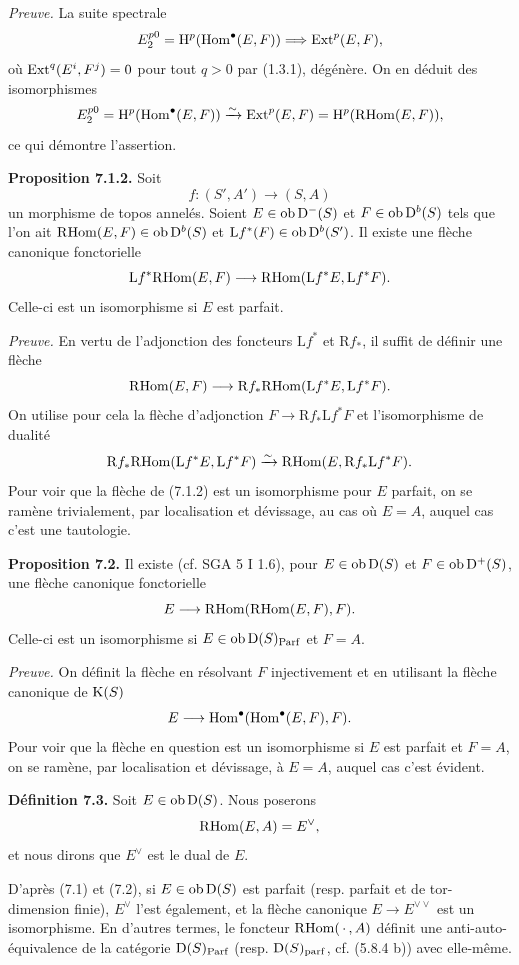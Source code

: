 \documentclass[11pt]{article}
\newcommand{\Parf}{\operatorname{Parf}}
\begin{document}
\emph{Preuve.} La suite spectrale
\[
  E_2^{p0}=\mathrm H^p(\operatorname{Hom}^\bullet(E,F))
  \Longrightarrow \operatorname{Ext}^p(E,F),
\]
où \(\operatorname{Ext}^q(E^i,F^j)=0\) pour tout \(q>0\) par (1.3.1), dégénère. On en déduit des isomorphismes
\[
  E_2^{p0}=\mathrm H^p(\operatorname{Hom}^\bullet(E,F))
  \xrightarrow{\sim}\operatorname{Ext}^p(E,F)=\mathrm H^p(\mathrm R\!\operatorname{Hom}(E,F)),
\]
ce qui démontre l'assertion.

\textbf{Proposition 7.1.2.} Soit
\[
  f:(S',A')\longrightarrow(S,A)
\]
un morphisme de topos annelés. Soient \(E\in\operatorname{ob}\mathrm D^-(S)\) et \(F\in\operatorname{ob}\mathrm D^b(S)\) tels que l'on ait \(\mathrm R\!\operatorname{Hom}(E,F)\in\operatorname{ob}\mathrm D^b(S)\) et \(\mathrm Lf^*(F)\in\operatorname{ob}\mathrm D^b(S')\). Il existe une flèche canonique fonctorielle
\[
  \mathrm Lf^*\mathrm R\!\operatorname{Hom}(E,F)
  \longrightarrow
  \mathrm R\!\operatorname{Hom}(\mathrm Lf^*E,\mathrm Lf^*F).
\]
Celle-ci est un isomorphisme si \(E\) est parfait.

\emph{Preuve.} En vertu de l'adjonction des foncteurs \(\mathrm Lf^*\) et \(\mathrm Rf_*\), il suffit de définir une flèche
\[
  \mathrm R\!\operatorname{Hom}(E,F)
  \longrightarrow
  \mathrm Rf_*\mathrm R\!\operatorname{Hom}(\mathrm Lf^*E,\mathrm Lf^*F).
\]
On utilise pour cela la flèche d'adjonction \(F\to\mathrm Rf_*\mathrm Lf^*F\) et l'isomorphisme de dualité
\[
  \mathrm Rf_*\mathrm R\!\operatorname{Hom}(\mathrm Lf^*E,\mathrm Lf^*F)
  \xrightarrow{\sim}
  \mathrm R\!\operatorname{Hom}(E,\mathrm Rf_*\mathrm Lf^*F).
\]
Pour voir que la flèche de (7.1.2) est un isomorphisme pour \(E\) parfait, on se ramène trivialement, par localisation et dévissage, au cas où \(E=A\), auquel cas c'est une tautologie.

\textbf{Proposition 7.2.} Il existe (cf. SGA 5 I 1.6), pour \(E\in\operatorname{ob}\mathrm D(S)\) et \(F\in\operatorname{ob}\mathrm D^+(S)\), une flèche canonique fonctorielle
\[
  E\longrightarrow\mathrm R\!\operatorname{Hom}(\mathrm R\!\operatorname{Hom}(E,F),F).
\]
Celle-ci est un isomorphisme si \(E\in\Ob\Dpx(S)_{\Parf}\) et \(F=A\).

\emph{Preuve.} On définit la flèche en résolvant \(F\) injectivement et en utilisant la flèche canonique de \(\mathrm K(S)\)
\[
  E\longrightarrow\operatorname{Hom}^\bullet(\operatorname{Hom}^\bullet(E,F),F).
\]
Pour voir que la flèche en question est un isomorphisme si \(E\) est parfait et \(F=A\), on se ramène, par localisation et dévissage, à \(E=A\), auquel cas c'est évident.

\textbf{Définition 7.3.} Soit \(E\in\operatorname{ob}\mathrm D(S)\). Nous poserons
\[
  \mathrm R\!\operatorname{Hom}(E,A)=E^\vee,
\]
et nous dirons que \(E^\vee\) est le dual de \(E\).

D'après (7.1) et (7.2), si \(E\in\operatorname{ob}\mathrm D(S)\) est parfait (resp. parfait et de tor-dimension finie), \(E^\vee\) l'est également, et la flèche canonique \(E\to E^{\vee\vee}\) est un isomorphisme. En d'autres termes, le foncteur \(\mathrm R\!\operatorname{Hom}(\,\cdot\,,A)\) définit une anti-auto-équivalence de la catégorie \(\Dpx(S)_{\Parf}\) (resp. \(\mathrm D(S)_{\operatorname{parf}}\), cf. (5.8.4 b)) avec elle-même.
\end{document}
